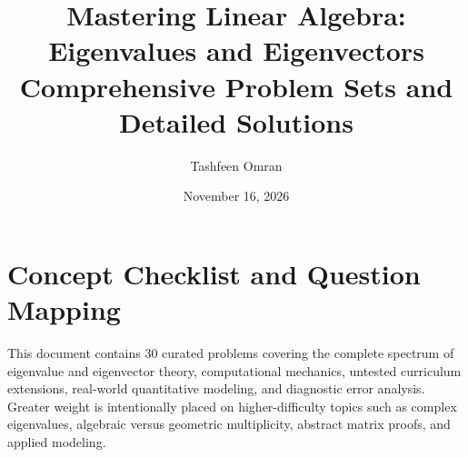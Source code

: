 \documentclass[11pt, letterpaper]{article}
\theoremstyle{definition}
\theoremstyle{remark}
\begin{document}
\title{Mastering Linear Algebra: Eigenvalues and Eigenvectors\\ \large Comprehensive Problem Sets and Detailed Solutions}
\author{Tashfeen Omran}
\date{November 16, 2026}

\maketitle
\tableofcontents
\newpage

\section{Concept Checklist and Question Mapping}

This document contains $30$ curated problems covering the complete spectrum of eigenvalue and eigenvector theory, computational mechanics, untested curriculum extensions, real-world quantitative modeling, and diagnostic error analysis. Greater weight is intentionally placed on higher-difficulty topics such as complex eigenvalues, algebraic versus geometric multiplicity, abstract matrix proofs, and applied modeling.
\end{document}
